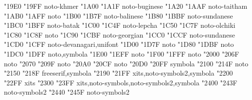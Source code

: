 \documentclass{article}
\begin{document}
                                  {  "19E0} {  "19FF} {noto-khmer}
                                       {  "1A00} {  "1A1F} {noto-buginese}
                                       {  "1A20} {  "1AAF} {noto-taitham}
           {  "1AB0} {  "1AFF} {noto}
                                       {  "1B00} {  "1B7F} {noto-balinese}
                                      {  "1B80} {  "1BBF} {noto-sundanese}
                                          {  "1BC0} {  "1BFF} {noto-batak}
                                         {  "1C00} {  "1C4F} {noto-lepcha}
                                       {  "1C50} {  "1C7F} {noto-olchiki}
                            {  "1C80} {  "1C8F} {noto}
                              {  "1C90} {  "1CBF} {noto-georgian}
                           {  "1CC0} {  "1CCF} {noto-sundanese}
                               {  "1CD0} {  "1CFF} {noto-devanagari,unifont}
                            {  "1D00} {  "1D7F} {noto}
                 {  "1D80} {  "1DBF} {noto}
         {  "1DC0} {  "1DFF} {noto,symbola}
                      {  "1E00} {  "1EFF} {noto}
                                 {  "1F00} {  "1FFF} {noto}
                            {  "2000} {  "206F} {noto}
                    {  "2070} {  "209F} {noto}
                               {  "20A0} {  "20CF} {noto}
        {  "20D0} {  "20FF} {symbola}
                             {  "2100} {  "214F} {noto}
                                   {  "2150} {  "218F} {freeserif,symbola}
                                         {  "2190} {  "21FF} {xits,noto-symbols2,symbola}
                         {  "2200} {  "22FF} {xits}
                        {  "2300} {  "23FF} {xits,noto-symbols,noto-symbols2,symbola}
                               {  "2400} {  "243F} {noto-symbols2}
                  {  "2440} {  "245F} {noto-symbols2}
\end{document}
